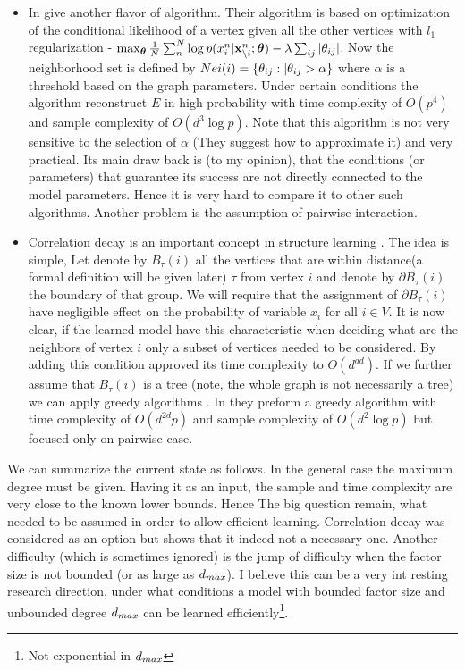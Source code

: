 \begin{itemize}
\item In \cite{ravikumar2010high} give another flavor of algorithm. Their algorithm is based on optimization of the conditional likelihood of a vertex given all the other vertices with $l_1$ regularization - $\max_{\boldsymbol{\theta}} \frac{1}{N}\sum_n^N \log p(x^n_i| {\bf x}^n_{\setminus i};\boldsymbol{\theta}) - \lambda \sum_{ij} |\theta_{ij}|$. Now the neighborhood set is defined by $Nei(i) = \{\theta_{ij} : |\theta_{ij} > \alpha\}$ where $\alpha$ is a threshold based on the graph parameters. Under certain conditions the algorithm reconstruct $E$ in high probability with time complexity of $O(p^4)$  and sample complexity of $O( d^3 \log p)$. Note that this algorithm is not very sensitive to the selection of $\alpha$ (They suggest how to approximate it) and very practical. Its main draw back is (to my opinion), that the conditions (or parameters) that guarantee its success are not directly connected to the model parameters. Hence it is very hard to compare it to other such algorithms. Another problem is the assumption of pairwise interaction.     
\item Correlation decay is an important concept in structure learning \cite{montanari2009graphical}. The idea is simple, Let denote by $B_{\tau}(i)$ all the vertices that are within distance(a formal definition will be given later) $\tau$ from vertex $i$ and denote by $\partial B_{\tau}(i)$ the boundary of that group. We will require that the assignment of $\partial B_{\tau}(i)$ have negligible effect on the probability of variable $x_i$ for all $i \in V$. It is now clear, if the learned model have this characteristic when deciding what are the neighbors of vertex $i$ only a subset of vertices needed to be considered. By adding this condition \cite{bresler2008reconstruction} approved its time complexity to $O(d^{ad})$. If we further assume that $B_{\tau}(i)$ is a tree (note, the whole graph is not necessarily a tree) we can apply greedy algorithms \cite{netrapalli2010greedy, anandkumar2013learning}. In \cite{anandkumar2013learning} they preform a greedy algorithm with time complexity of $O(d^{2d}p)$ and sample complexity of $O(d^2\log p)$ but focused only on pairwise case.  
\end{itemize}
We can summarize the current state as follows. 
In the general case the maximum degree must be given. Having it as an input, the sample and time complexity are very close to the known lower bounds. 
Hence The big question remain, what needed to be assumed in order to allow efficient learning. 
Correlation decay was considered as an option\cite{montanari2009graphical} but \cite{bresler2014structure} shows that it indeed not a necessary one. 
Another difficulty (which is sometimes ignored) is the jump of difficulty when the factor size is not bounded (or as large as $d_{max}$). 
I believe this can be a very int resting research direction, under what conditions  a model with bounded factor size and unbounded degree $d_{max}$ can be learned efficiently\footnote{Not exponential in $d_{max}$}.
